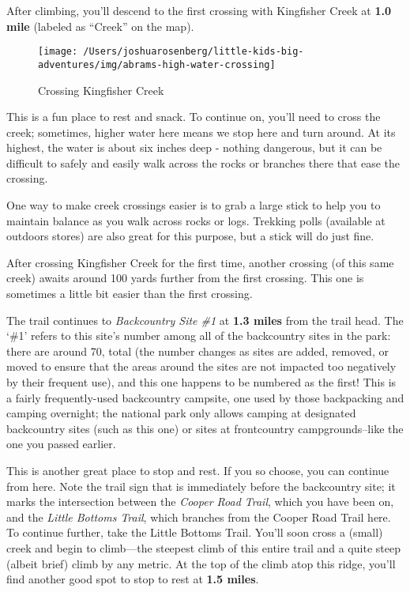 \documentclass[
]{book}
\begin{document}
After climbing, you'll descend to the first crossing with Kingfisher Creek at \textbf{1.0 mile} (labeled as ``Creek'' on the map).

\begin{figure}

{\centering \texttt{[image: /Users/joshuarosenberg/little-kids-big-adventures/img/abrams-high-water-crossing]} 

}

\caption{Crossing Kingfisher Creek}\label{fig:unnamed-chunk-42}
\end{figure}

This is a fun place to rest and snack. To continue on, you'll need to cross the
creek; sometimes, higher water here means we stop here and turn around. At its
highest, the water is about six inches deep - nothing dangerous, but it can be
difficult to safely and easily walk across the rocks or branches there that
ease the crossing.

\begin{rmdtip}
One way to make creek crossings easier is to grab a large stick to help
you to maintain balance as you walk across rocks or logs. Trekking polls
(available at outdoors stores) are also great for this purpose, but a
stick will do just fine.
\end{rmdtip}

After crossing Kingfisher Creek for the first time, another crossing (of this
same creek) awaits around 100 yards further from the first crossing. This one
is sometimes a little bit easier than the first crossing.

The trail continues to \emph{Backcountry Site \#1} at \textbf{1.3 miles} from the trail
head. The `\#1' refers to this site's number among all of the backcountry sites
in the park: there are around 70, total (the number changes as sites are added,
removed, or moved to ensure that the areas around the sites are not impacted
too negatively by their frequent use), and this one happens to be numbered as
the first! This is a fairly frequently-used backcountry campsite, one used by
those backpacking and camping overnight; the national park only allows camping
at designated backcountry sites (such as this one) or sites at frontcountry
campgrounds--like the one you passed earlier.

This is another great place to stop and rest. If you so choose, you can
continue from here. Note the trail sign that is immediately before the
backcountry site; it marks the intersection between the \emph{Cooper Road Trail},
which you have been on, and the \emph{Little Bottoms Trail}, which branches from the
Cooper Road Trail here. To continue further, take the Little Bottoms Trail.
You'll soon cross a (small) creek and begin to climb---the steepest climb of
this entire trail and a quite steep (albeit brief) climb by any metric. At the
top of the climb atop this ridge, you'll find another good spot to stop to rest
at \textbf{1.5 miles}.
\end{document}
